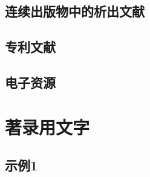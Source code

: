 \documentclass{article}
\begin{document}
\subsection{连续出版物中的析出文献}
\begin{refsection}

\nocite{袁训来2012-3219-3219,
余建斌2013--,
李炳穆2008-6-12,
李幼平2010-225-228,
武丽丽2008-8-9,
Kanamori1998-2063-2063,
Caplan1993-61-66,
Frese2013-378-398,
Myburg2014-356-362
}

\printbibliography[heading=subbibliography,title={示例:}]
\end{refsection}

\subsection{专利文献}
\begin{refsection}

\nocite{邓一刚2006--,
西安电子科技大学2002--,
Tachibana2005--}

{
\printbibliography[heading=subbibliography,title={示例:}]
}
\end{refsection}

\subsection{电子资源}
\begin{refsection}

\nocite{中国互联网络信息中心2012--,
北京市人民政府办公厅2005--,
Bawden2008--,
OCLC--,
Hopkinson2009--
}

{
\printbibliography[heading=subbibliography,title={示例:}]
}
\end{refsection}

\section{著录用文字}
\subsection{示例1}
\begin{refsection}
\nocite{周鲁卫2011--}
\nocite{常森2013--}
\nocite{kereanrefa}
\nocite{japaneserefc}
\nocite{RUDDOCK2009--}
\nocite{russianrefc}
\printbibliography[heading=subbibliography,title={用原语种著录参考文献}]
\end{refsection}
\end{document}

